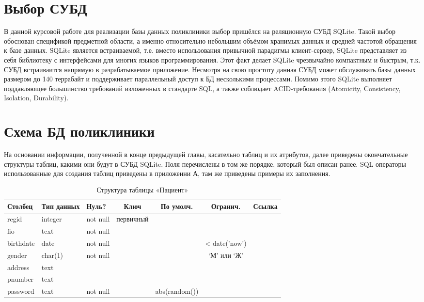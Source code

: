 \documentclass[14pt,a4paper,russian]{extreport}
\begin{document}
\section{Выбор СУБД}
В данной курсовой работе для реализации базы данных поликлиники выбор пришёлся на реляционную СУБД
SQLite. Такой выбор обоснован спецификой предметной области, а именно относительно небольшим
объёмом хранимых данных и средней частотой обращения к базе данных. SQLite является
встраиваемой, т.е. вместо использования привычной парадигмы клиент-сервер, SQLite представляет из
себя библиотеку с интерфейсами для многих языков программирования. Этот факт делает SQLite
чрезвычайно компактным и быстрым, т.к. СУБД встраиваится напрямую в разрабатываемое приложение.
Несмотря на свою простоту данная СУБД может обслуживать базы данных размером до 140 террабайт и
поддерживает параллельный доступ к БД несколькими процессами. Помимо этого SQLite выполняет
поддавляющее большинство требований изложенных в стандарте SQL, а также соблюдает ACID-требования
(Atomicity, Consistency, Isolation, Durability).\cite{sqlite}


\section{Схема БД поликлиники}
На основании информации, полученной в конце предыдущей главы, касательно таблиц и их атрибутов,
далее приведены окончательные структуры таблиц, какими они будут в СУБД SQLite. Поля перечислены в
том же порядке, который был описан ранее. SQL операторы
использованные для создания таблиц приведены в приложенни А, там же приведены примеры их
заполнения.
\setcounter{lstlisting}{0}

\begin{table}[h!]
    \caption{ } 
    \begin{subtable}[t]{\textwidth}
        \caption{Структура таблицы «Пациент»}
    \begin{tabularx}{\textwidth}{| X | X | X | c | c | c | X |}
        \hline
        \textbf{Столбец} & \textbf{Тип данных} & \textbf{Нуль?} & \textbf{Ключ} & \textbf{По
        умолч.} & \textbf{Огранич.} & \textbf{Ссылка} \\ \hline
        regid & integer & not null & первичный & & & \\ \hline
        fio & text & not null & & & & \\ \hline
        birthdate & date & not null & & & < date('now') & \\ \hline
        gender & char(1) & not null & & & `М' или `Ж' & \\ \hline
        address & text & & & & & \\ \hline
        pnumber & text & & & & & \\ \hline
        password & text & not null & & abs(random()) & & \\ \hline
    \end{tabularx}
    \end{subtable}
    \label{table:pat}
\end{table}
\end{document}
